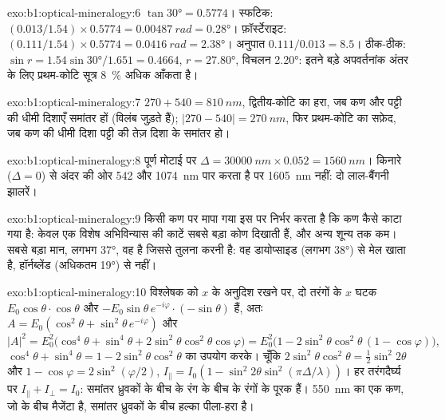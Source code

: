 \begin{solution}{exo:b1:optical-mineralogy:6}
$\tan\ang{30} = 0.5774$। स्फटिक: $(0.013/1.54)\times0.5774 = \qty{0.00487}{rad}
= \ang{0.28}$। फ़ॉर्स्टेराइट: $(0.111/1.54)\times0.5774 = \qty{0.0416}{rad} =
\ang{2.38}$। अनुपात $0.111/0.013 = 8.5$। ठीक-ठीक: $\sin r = 1.54\sin\ang{30}/1.651
= 0.4664$, $r = \ang{27.80}$, विचलन \ang{2.20}: इतने बड़े अपवर्तनांक अंतर के लिए प्रथम-कोटि सूत्र \qty{8}{\percent} अधिक
आँकता है।
\end{solution}

\begin{solution}{exo:b1:optical-mineralogy:7}
$270 + 540 = \qty{810}{nm}$, द्वितीय-कोटि का हरा, जब कण और पट्टी की धीमी दिशाएँ समांतर हों (विलंब जुड़ते हैं); $|270 - 540| =
\qty{270}{nm}$, फिर प्रथम-कोटि का सफ़ेद, जब कण की धीमी दिशा पट्टी की तेज़ दिशा के समांतर हो।
\end{solution}

\begin{solution}{exo:b1:optical-mineralogy:8}
पूर्ण मोटाई पर $\Delta = \qty{30000}{nm}\times0.052 = \qty{1560}{nm}$। किनारे ($\Delta = 0$) से अंदर की ओर  542 और
\qty{1074}{nm} पार करता है पर \qty{1605}{nm} नहीं: दो लाल-बैंगनी झालरें।
\end{solution}

\begin{solution}{exo:b1:optical-mineralogy:9}
किसी कण पर मापा गया  इस पर निर्भर करता है कि कण कैसे काटा गया है: केवल एक विशेष अभिविन्यास की काटें सबसे बड़ा
कोण दिखाती हैं, और अन्य शून्य तक कम। सबसे बड़ा मान, लगभग \ang{37}, वह है जिससे तुलना करनी है: वह डायोप्साइड
(लगभग \ang{38}) से मेल खाता है, हॉर्नब्लेंड (अधिकतम \ang{19}) से नहीं।
\end{solution}

\begin{solution}{exo:b1:optical-mineralogy:10}
विश्लेषक को $x$ के अनुदिश रखने पर, दो तरंगों के $x$ घटक $E_0\cos\theta\cdot\cos\theta$ और
$-E_0\sin\theta\,e^{-i\varphi}\cdot(-\sin\theta)$ हैं, अतः $A = E_0(\cos^2\theta + \sin^2\theta\,e^{-i\varphi})$ और
\[
  |A|^2 = E_0^2\bigl(\cos^4\theta + \sin^4\theta + 2\sin^2\theta\cos^2\theta\cos\varphi\bigr)
  = E_0^2\bigl(1 - 2\sin^2\theta\cos^2\theta\,(1 - \cos\varphi)\bigr),
\]
$\cos^4\theta + \sin^4\theta = 1 - 2\sin^2\theta\cos^2\theta$ का उपयोग करके। चूँकि
$2\sin^2\theta\cos^2\theta = \frac12\sin^2 2\theta$ और $1 - \cos\varphi =
2\sin^2(\varphi/2)$, $I_\parallel = I_0(1 - \sin^2 2\theta\sin^2(\pi\Delta/\lambda))$।
हर तरंगदैर्घ्य पर $I_\parallel + I_\perp = I_0$: समांतर ध्रुवकों के बीच के रंग  के बीच के रंगों के पूरक हैं। \qty{550}{nm}
का एक कण, जो  के बीच मैजेंटा है, समांतर ध्रुवकों के बीच हल्का पीला-हरा है।
\end{solution}

